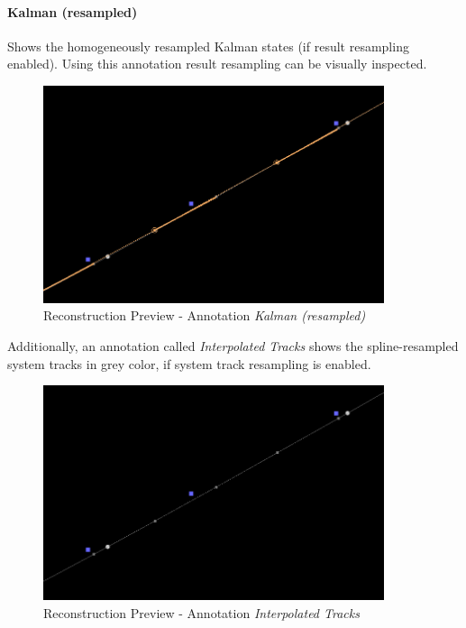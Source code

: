 \paragraph{Kalman (resampled)} Shows the homogeneously resampled Kalman states (if result resampling enabled).
Using this annotation result resampling can be visually inspected.

\begin{figure}[H]
    \center
      \includegraphics[width=10cm]{figures/ui_task_references_recprev_final.png}
    \caption{Reconstruction Preview - Annotation \textit{Kalman (resampled)}} 
\end{figure}

Additionally, an annotation called \textit{Interpolated Tracks} shows the spline-resampled system tracks in grey color,
if system track resampling is enabled.

\begin{figure}[H]
    \center
      \includegraphics[width=10cm]{figures/ui_task_references_recprev_interp.png}
    \caption{Reconstruction Preview - Annotation \textit{Interpolated Tracks}} 
\end{figure}
